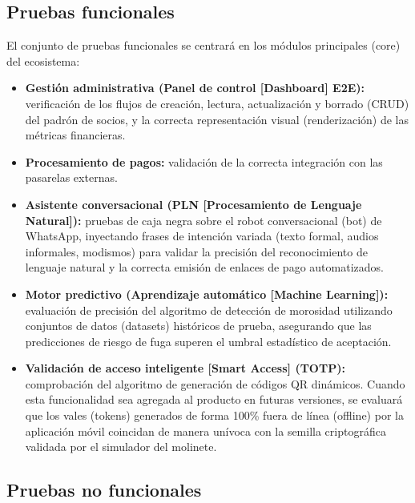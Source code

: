 \subsection{Pruebas funcionales}

El conjunto de pruebas funcionales se centrará en los módulos principales (core) del ecosistema:

\begin{itemize}
    \item \textbf{Gestión administrativa (Panel de control [Dashboard] E2E):} verificación de los flujos de creación, lectura, actualización y borrado (CRUD) del padrón de socios, y la correcta representación visual (renderización) de las métricas financieras.
    \item \textbf{Procesamiento de pagos:} validación de la correcta integración con las pasarelas externas.
    \item \textbf{Asistente conversacional (PLN [Procesamiento de Lenguaje Natural]):} pruebas de caja negra sobre el robot conversacional (bot) de WhatsApp, inyectando frases de intención variada (texto formal, audios informales, modismos) para validar la precisión del reconocimiento de lenguaje natural y la correcta emisión de enlaces de pago automatizados.
    \item \textbf{Motor predictivo (Aprendizaje automático [Machine Learning]):} evaluación de precisión del algoritmo de detección de morosidad utilizando conjuntos de datos (datasets) históricos de prueba, asegurando que las predicciones de riesgo de fuga superen el umbral estadístico de aceptación.
    \item \textbf{Validación de acceso inteligente [Smart Access] (TOTP):} comprobación del algoritmo de generación de códigos QR dinámicos. Cuando esta funcionalidad sea agregada al producto en futuras versiones, se evaluará que los vales (tokens) generados de forma 100\% fuera de línea (offline) por la aplicación móvil coincidan de manera unívoca con la semilla criptográfica validada por el simulador del molinete.
\end{itemize}

\subsection{Pruebas no funcionales}

